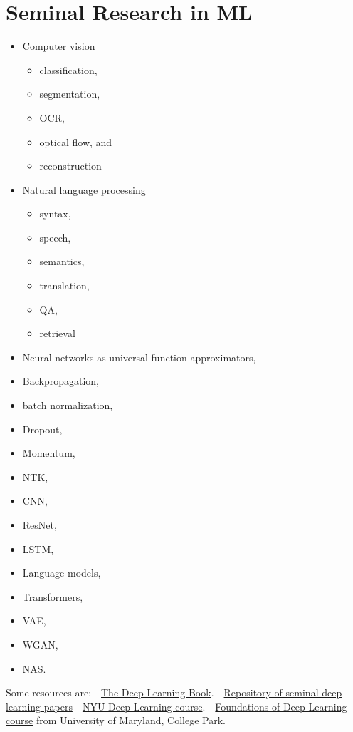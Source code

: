 \hypertarget{seminal-research-in-ml}{%
\section{Seminal Research in ML}\label{seminal-research-in-ml}}

\begin{itemize}
\tightlist
\item
  Computer vision

  \begin{itemize}
  \tightlist
  \item
    classification,
  \item
    segmentation,
  \item
    OCR,
  \item
    optical flow, and
  \item
    reconstruction
  \end{itemize}
\item
  Natural language processing

  \begin{itemize}
  \tightlist
  \item
    syntax,
  \item
    speech,
  \item
    semantics,
  \item
    translation,
  \item
    QA,
  \item
    retrieval
  \end{itemize}
\item
  Neural networks as universal function approximators,
\item
  Backpropagation,
\item
  batch normalization,
\item
  Dropout,
\item
  Momentum,
\item
  NTK,
\item
  CNN,
\item
  ResNet,
\item
  LSTM,
\item
  Language models,
\item
  Transformers,
\item
  VAE,
\item
  WGAN,
\item
  NAS.
\end{itemize}

Some resources are: - \href{https://deeplearningbook.org}{The Deep
Learning Book}. -
\href{https://github.com/terryum/awesome-deep-learning-papers}{Repository
of seminal deep learning papers} -
\href{https://www.youtube.com/playlist?list=PLLHTzKZzVU9e6xUfG10TkTWApKSZCzuBI}{NYU
Deep Learning course}. -
\href{http://www.cs.umd.edu/class/fall2020/cmsc828W/}{Foundations of
Deep Learning course} from University of Maryland, College Park.
